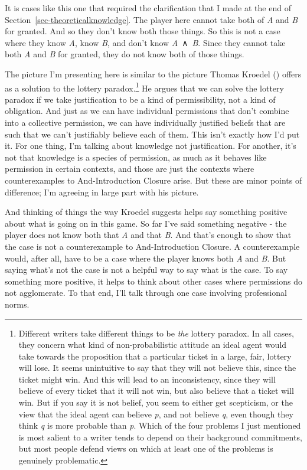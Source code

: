\documentclass[
  12pt,
  letterpaper,
]{scrbook}
\begin{document}
It is cases like this one that required the clarification that I made at
the end of Section~\ref{sec-theoreticalknowledge}. The player here
cannot take both of \emph{A} and \emph{B} for granted. And so they don't
know both those things. So this is not a case where they know \emph{A},
know \emph{B}, and don't know \emph{A}~∧~\emph{B}. Since they cannot
take both \emph{A} and \emph{B} for granted, they do not know both of
those things.

The picture I'm presenting here is similar to the picture Thomas Kroedel
() offers as a solution to the lottery
paradox.\footnote{Different writers take different things to be
  \emph{the} lottery paradox. In all cases, they concern what kind of
  non-probabilistic attitude an ideal agent would take towards the
  proposition that a particular ticket in a large, fair, lottery will
  lose. It seems unintuitive to say that they will not believe this,
  since the ticket might win. And this will lead to an inconsistency,
  since they will believe of every ticket that it will not win, but also
  believe that a ticket will win. But if you say it is not belief, you
  seem to either get scepticism, or the view that the ideal agent can
  believe \emph{p}, and not believe \emph{q}, even though they think
  \emph{q} is more probable than \emph{p}. Which of the four problems I
  just mentioned is most salient to a writer tends to depend on their
  background commitments, but most people defend views on which at least
  one of the problems is genuinely problematic.} He argues that we can
solve the lottery paradox if we take justification to be a kind of
permissibility, not a kind of obligation. And just as we can have
individual permissions that don't combine into a collective permission,
we can have individually justified beliefs that are such that we can't
justifiably believe each of them. This isn't exactly how I'd put it. For
one thing, I'm talking about knowledge not justification. For another,
it's not that knowledge is a species of permission, as much as it
behaves like permission in certain contexts, and those are just the
contexts where counterexamples to And-Introduction Closure arise. But
these are minor points of difference; I'm agreeing in large part with
his picture.

And thinking of things the way Kroedel suggests helps say something
positive about what is going on in this game. So far I've said something
negative - the player does not know both that \emph{A} and that
\emph{B}. And that's enough to show that the case is not a
counterexample to And-Introduction Closure. A counterexample would,
after all, have to be a case where the player knows both \emph{A} and
\emph{B}. But saying what's not the case is not a helpful way to say
what is the case. To say something more positive, it helps to think
about other cases where permissions do not agglomerate. To that end,
I'll talk through one case involving professional norms.
\end{document}
